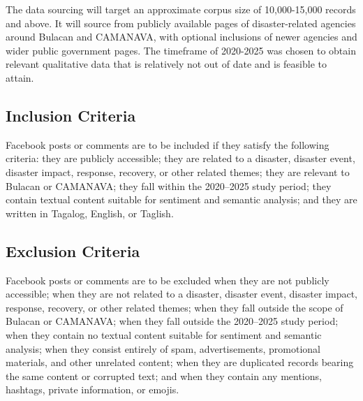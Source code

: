 \documentclass[12pt,a4paper]{report}
\begin{document}
The data sourcing will target an approximate corpus size of 10,000-15,000
records and above. It will source from publicly available pages of
disaster-related agencies around Bulacan and CAMANAVA, with optional inclusions
of newer agencies and wider public government pages. The timeframe of
2020-2025 was chosen to obtain relevant qualitative data that is relatively
not out of date and is feasible to attain.

\subsection{Inclusion Criteria}

Facebook posts or comments are to be included if they satisfy the following
criteria: they are publicly accessible; they are related to a disaster,
disaster event, disaster impact, response, recovery, or other related themes;
they are relevant to Bulacan or CAMANAVA; they fall within the 2020--2025
study period; they contain textual content suitable for sentiment and semantic
analysis; and they are written in Tagalog, English, or Taglish.

\subsection{Exclusion Criteria}

Facebook posts or comments are to be excluded when they are not publicly
accessible; when they are not related to a disaster, disaster event, disaster
impact, response, recovery, or other related themes; when they fall outside the
scope of Bulacan or CAMANAVA; when they fall outside the 2020--2025 study
period; when they contain no textual content suitable for sentiment and
semantic analysis; when they consist entirely of spam, advertisements,
promotional materials, and other unrelated content; when they are duplicated
records bearing the same content or corrupted text; and when they contain any
mentions, hashtags, private information, or emojis.
\end{document}
